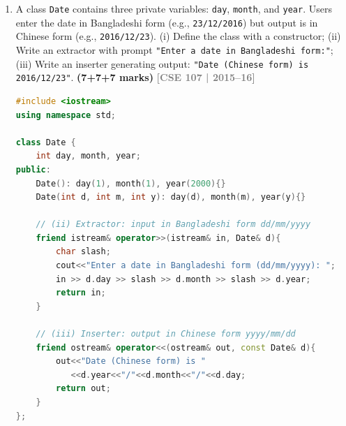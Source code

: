 \documentclass[12pt,a3paper]{article}
\newcommand{\yr}[1]{\hfill\textcolor{gray}{\small\textbf{[#1]}}}
\newcommand{\mk}[1]{\textcolor{orange!70!black}{\small\textbf{(#1 marks)}}}
\begin{document}
\begin{enumerate}
\begin{tcolorbox}[enhanced,breakable,ansbox,colback=cA!4,colframe=cA,
  boxrule=0.8pt,arc=5pt,
  title={\textbf{Answer --- File I/O status check program}},
  fonttitle=\bfseries\color{white},colbacktitle=cA]
\begin{lstlisting}[language=C++]
    ifstream fin("test.txt");
    if(!fin){ cout<<"Cannot open file for reading\n"; return 1; }

    string line;
    while(getline(fin, line)){
        cout << line << "\n";
        
        // Check status after each read using rdstate()
        ios::iostate state = fin.rdstate();
        if(state & ios::badbit){  cout<<"Fatal I/O error\n"; break; }
        if(state & ios::failbit){ cout<<"Logical I/O error\n"; break; }
    }

    // Check for EOF using rdstate()
    if(fin.rdstate() & ios::eofbit) cout<<"End of file reached normally.\n";
    
    fin.close();
    return 0;
}
\end{lstlisting}

\end{tcolorbox}


\item A class \texttt{Date} contains three private variables: \texttt{day}, \texttt{month}, and \texttt{year}. Users enter the date in Bangladeshi form (e.g., \texttt{23/12/2016}) but output is in Chinese form (e.g., \texttt{2016/12/23}). (i) Define the class with a constructor; (ii) Write an extractor with prompt \texttt{"Enter a date in Bangladeshi form:"}; (iii) Write an inserter generating output: \texttt{"Date (Chinese form) is 2016/12/23"}. \mk{7+7+7}
\yr{CSE 107 | 2015--16}
\begin{tcolorbox}[enhanced,breakable,ansbox,colback=cA!4,colframe=cA,
  boxrule=0.8pt,arc=5pt,
  title={\textbf{Answer --- Date class inserter/extractor; Bangladeshi input, Chinese output}},
  fonttitle=\bfseries\color{white},colbacktitle=cA]

\begin{lstlisting}[language=C++]
#include <iostream>
using namespace std;

class Date {
    int day, month, year;
public:
    Date(): day(1), month(1), year(2000){}
    Date(int d, int m, int y): day(d), month(m), year(y){}

    // (ii) Extractor: input in Bangladeshi form dd/mm/yyyy
    friend istream& operator>>(istream& in, Date& d){
        char slash;
        cout<<"Enter a date in Bangladeshi form (dd/mm/yyyy): ";
        in >> d.day >> slash >> d.month >> slash >> d.year;
        return in;
    }

    // (iii) Inserter: output in Chinese form yyyy/mm/dd
    friend ostream& operator<<(ostream& out, const Date& d){
        out<<"Date (Chinese form) is "
           <<d.year<<"/"<<d.month<<"/"<<d.day;
        return out;
    }
};


\end{lstlisting}
\end{tcolorbox}
\end{enumerate}
\end{document}
